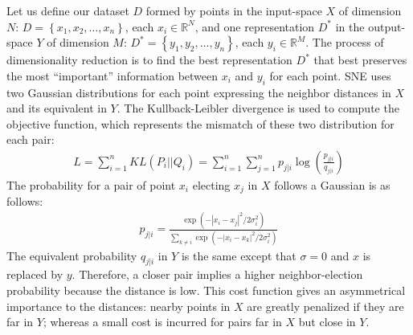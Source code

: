 \documentclass[a4paper,12pt]{report}
\newcommand{\R}{\mathbb{R}}
\begin{document}
Let us define our dataset $D$ formed by points in the input-space $X$ of dimension $N$: $D = \left\{ x_1, x_2, \dots, x_n \right\}$, each $x_i \in \R^N$, and one representation $D^\ast$ in the output-space $Y$ of dimension $M$: $D^\ast = \left\{ y_1, y_2, \dots, y_n \right\}$, each $y_i \in \R^M$.
The process of dimensionality reduction is to find the best representation $D^\ast$ that best preserves the most ``important'' information between $x_i$ and $y_i$ for each point.
SNE uses two Gaussian distributions for each point expressing the neighbor distances in $X$ and its equivalent in $Y$.
The Kullback-Leibler divergence is used to compute the objective function, which represents the mismatch of these two distribution for each pair:
\begin{eqnarray}
    L = \sum_{i=1}^n KL(P_i || Q_i) = \sum_{i=1}^n \sum_{j=1}^n p_{j|i} \log\left(\frac{p_{j|i}}{q_{j|i}}\right)
\end{eqnarray}
The probability for a pair of point $x_i$ electing $x_j$ in $X$ follows a Gaussian is as follows:
\begin{eqnarray}
    p_{j|i} = \frac{\exp(-|x_i - x_j|^2 / 2 \sigma_i^2)}{\sum_{k \not = i} \exp(-|x_i - x_k|^2 / 2 \sigma_i^2 )}
\end{eqnarray}
The equivalent probability $q_{j|i}$ in $Y$ is the same except that $\sigma = 0$ and $x$ is replaced by $y$.
Therefore, a closer pair implies a higher neighbor-election probability because the distance is low.
This cost function gives an asymmetrical importance to the distances: nearby points in $X$ are greatly penalized if they are far in $Y$; whereas a small cost is incurred for pairs far in $X$ but close in $Y$.
\end{document}
